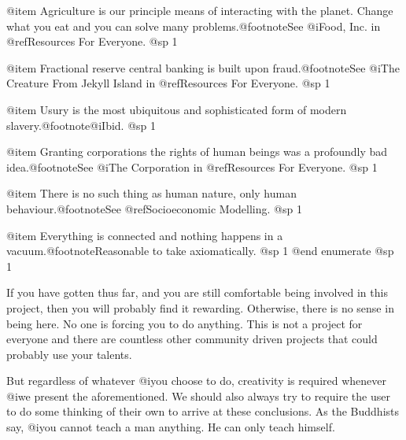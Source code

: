 @item
Agriculture is our principle means of interacting with the planet. Change what you eat and you can solve many problems.@footnote{See @i{Food, Inc.} in @ref{Resources For Everyone}.}
@sp 1

@item
Fractional reserve central banking is built upon fraud.@footnote{See @i{The Creature From Jekyll Island} in @ref{Resources For Everyone}.}
@sp 1

@item
Usury is the most ubiquitous and sophisticated form of modern slavery.@footnote{@i{Ibid.}}
@sp 1

@item
Granting corporations the rights of human beings was a profoundly bad idea.@footnote{See @i{The Corporation} in @ref{Resources For Everyone}.}
@sp 1

@item
There is no such thing as human nature, only human behaviour.@footnote{See @ref{Socioeconomic Modelling}.}
@sp 1

@item
Everything is connected and nothing happens in a vacuum.@footnote{Reasonable to take axiomatically.}
@sp 1
@end enumerate
@sp 1

If you have gotten thus far, and you are still comfortable being involved in this project, then you will probably find it rewarding. Otherwise, there is no sense in being here. No one is forcing you to do anything. This is not a project for everyone and there are countless other community driven projects that could probably use your talents.

But regardless of whatever @i{you} choose to do, creativity is required whenever @i{we} present the aforementioned. We should also always try to require the user to do some thinking of their own to arrive at these conclusions. As the Buddhists say, @i{you cannot teach a man anything. He can only teach himself}.

